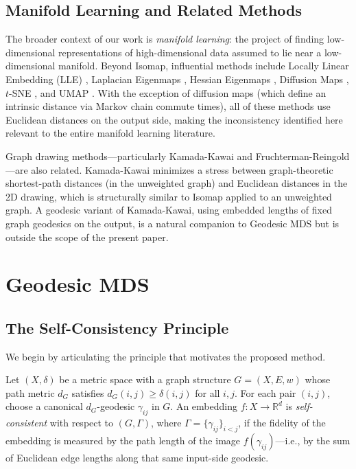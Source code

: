 \documentclass[twoside,11pt]{article}
\newcommand{\R}{\mathbb{R}}
\begin{document}
\subsection{Manifold Learning and Related Methods}
\label{sec:manifold_learning}

The broader context of our work is \emph{manifold learning}: the project
of finding low-dimensional representations of high-dimensional data assumed
to lie near a low-dimensional manifold.  Beyond Isomap, influential methods
include Locally Linear Embedding (LLE) \citep{roweis2000nonlinear},
Laplacian Eigenmaps \citep{belkin2003laplacian}, Hessian Eigenmaps
\citep{donoho2003hessian}, Diffusion Maps \citep{coifman2006diffusion},
$t$-SNE \citep{vandermaaten2008tsne}, and UMAP \citep{mcinnes2018umap}.
With the exception of diffusion maps (which define an intrinsic distance via
Markov chain commute times), all of these methods use Euclidean distances
on the output side, making the inconsistency identified here relevant to the
entire manifold learning literature.

Graph drawing methods---particularly Kamada-Kawai \citep{kamada1989algorithm}
and Fruchterman-Reingold \citep{fruchterman1991graph}---are also related.
Kamada-Kawai minimizes a stress between graph-theoretic shortest-path
distances (in the unweighted graph) and Euclidean distances in the 2D
drawing, which is structurally similar to Isomap applied to an unweighted
graph.  A geodesic variant of Kamada-Kawai, using embedded lengths of
fixed graph geodesics on the output, is a natural companion to Geodesic
MDS but is outside the scope of the present paper.

\section{Geodesic MDS}
\label{sec:geodesic_mds}

\subsection{The Self-Consistency Principle}
\label{sec:self_consistency}

We begin by articulating the principle that motivates the proposed method.

\begin{definition}
  \label{def:self_consistency}
  Let $(X, \delta)$ be a metric space with a graph structure $G = (X, E,
  w)$ whose path metric $d_G$ satisfies $d_G(i,j) \geq \delta(i,j)$ for
  all $i,j$.  For each pair $(i,j)$, choose a canonical $d_G$-geodesic
  $\gamma_{ij}$ in $G$.  An embedding $f: X \to \R^d$ is
  \emph{self-consistent} with respect to $(G, \Gamma)$, where
  $\Gamma = \{\gamma_{ij}\}_{i<j}$, if the fidelity of the embedding is
  measured by the path length of the image $f(\gamma_{ij})$---i.e., by the
  sum of Euclidean edge lengths along that same input-side geodesic.
\end{definition}
\end{document}
